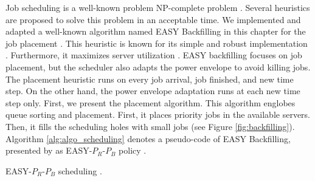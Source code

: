 Job scheduling is a well-known problem NP-complete problem \cite{robert2009introduction, agrawal2021energy}. Several heuristics are proposed to solve this problem in an acceptable time. We implemented and adapted a well-known algorithm named EASY Backfilling in this chapter for the job placement \cite{mu2001utilization}. This heuristic is known for its simple and robust implementation \cite{srinivasan2002characterization}. Furthermore, it maximizes server utilization \cite{srinivasan2002characterization}. EASY backfilling focuses on job placement, but the scheduler also adapts the power envelope to avoid killing jobs. The placement heuristic runs on every job arrival, job finished, and new time step. On the other hand, the power envelope adaptation runs at each new time step only. First, we present the placement algorithm. This algorithm englobes queue sorting and placement. First, it places priority jobs in the available servers. Then, it fills the scheduling holes with small jobs (see Figure \ref{fig:backfilling}). Algorithm \ref{alg:algo_scheduling} denotes a pseudo-code of EASY Backfilling, presented by \citeauthor{lelong2018tuning} as EASY-$P_{R}$-$P_{B}$ policy \cite{lelong2018tuning}.

\IncMargin{1em}
\begin{algorithm}[!htb]
    \LinesNumbered
    \footnotesize
    \SetAlgoLined
    \caption[EASY-$P_{R}$-$P_{B}$ scheduling.]{EASY-$P_{R}$-$P_{B}$ scheduling \cite{lelong2018tuning}.}
    \label{alg:algo_scheduling}
\end{algorithm}
\DecMargin{1em}

